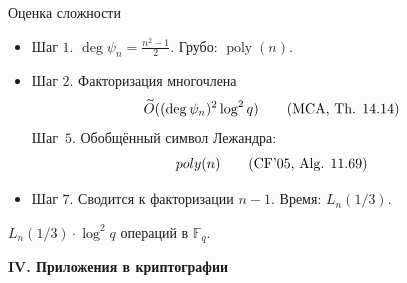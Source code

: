 \documentclass{beamer}
\begin{document}
\begin{frame}{Оценка сложности}
	\begin{itemize}
		\item Шаг $1$. $\deg \psi_n = \frac{n^2 - 1}{2}$. Грубо: $\operatorname{poly}(n)$. \\
		\item Шаг $2$.
		Факторизация многочлена
		\begin{equation}
			\widetilde{O}((\deg{\psi_n})^2 \log^2{q}) 	
			\tag{\text{MCA, Th. 14.14}}
		\end{equation}
		Шаг~$5$. Обобщённый символ Лежандра:
		\begin{equation}
			poly(n) 
			\tag{\text{CF'05, Alg. 11.69}}
		\end{equation}
		\item Шаг $7$. Сводится к факторизации $n-1$. Время: $L_n(1/3)$.
	\end{itemize}
	$L_n({1/3}) \cdot\log^2{q}$ операций в $\mathbb{F}_q$.
\end{frame}

\begin{frame}
	\begin{center}
		\textcolor{title-and-section-color}{{\LARGE \textbf{IV. Приложения в криптографии}}}
	\end{center}
\end{frame}

\end{document}
